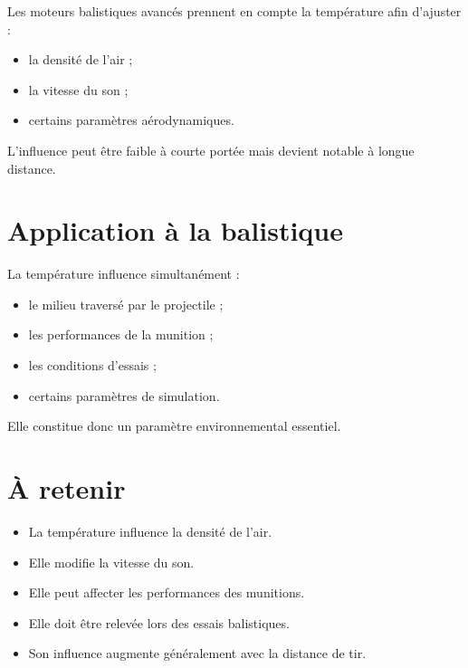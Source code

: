 \begin{simulation}

Les moteurs balistiques avancés prennent en compte la température afin
d'ajuster :

\begin{itemize}
\item la densité de l'air ;
\item la vitesse du son ;
\item certains paramètres aérodynamiques.
\end{itemize}

L'influence peut être faible à courte portée mais devient notable à longue
distance.

\end{simulation}

\section{Application à la balistique}

La température influence simultanément :

\begin{itemize}
\item le milieu traversé par le projectile ;
\item les performances de la munition ;
\item les conditions d'essais ;
\item certains paramètres de simulation.
\end{itemize}

Elle constitue donc un paramètre environnemental essentiel.

\section{À retenir}

\begin{aretenir}

\begin{itemize}
\item La température influence la densité de l'air.
\item Elle modifie la vitesse du son.
\item Elle peut affecter les performances des munitions.
\item Elle doit être relevée lors des essais balistiques.
\item Son influence augmente généralement avec la distance de tir.
\end{itemize}

\end{aretenir}


